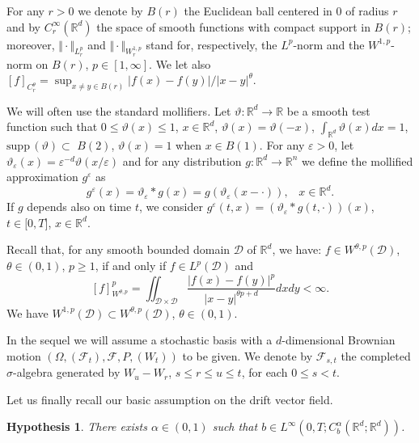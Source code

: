 \documentclass{article}
\newtheorem{hypothesis}{Hypothesis}
\begin{document}
For any $r>0$ we denote by $B(r)$ the Euclidean ball centered in 0 of radius
$r$ and by $C_{r}^{\infty}(\mathbb{R}^{d})$ the space of smooth functions with
compact support in $B(r)$; moreover, $\Vert\cdot\Vert_{L_{r}^{p}}$ and
$\Vert\cdot\Vert_{W_{r}^{1,p}}$ stand for, respectively, the $L^{p}$-norm and
the $W^{1,p}$-norm on $B\left(  r\right)  $, $p\in\left[  1,\infty\right]  $.
We let also $[f]_{C^{\theta}_{r}}=\sup_{x\neq y \in B(r)}%
|f(x)-f(y)|/|x-y|^{\theta}$.

We will often use the standard mollifiers\textit{.} Let $\vartheta
:{\mathbb{R}}^{d}\rightarrow{\mathbb{R}}$ be a smooth test function such that
$0\leq\vartheta(x)\leq1$, $x\in{\mathbb{R}}^{d}$, $\vartheta(x)=\vartheta
(-x)$, $\int_{{\mathbb{R}}^{d}}\vartheta(x)dx=1$, $\mathrm{supp}%
\,(\vartheta)\subset$ $B(2)$, $\vartheta(x)=1$ when $x\in B(1)$. For any
${\varepsilon}>0$, let $\vartheta_{{\varepsilon}}(x)={\varepsilon}%
^{-d}\vartheta(x/{\varepsilon})$ and for any distribution $g:{\mathbb{R}}%
^{d}\rightarrow{\mathbb{R}}^{n}$ we define the mollified approximation
$g^{\varepsilon}$ as
\begin{equation}
g^{\varepsilon}(x)=\vartheta_{{\varepsilon}}\ast g(x)=g(\vartheta
_{{\varepsilon}}(x-\cdot)),\;\;\;x\in{\mathbb{R}}^{d}.\label{molli}%
\end{equation}
If $g$ depends also on time $t$, we consider $g^{\varepsilon}(t,x)=(\vartheta
_{{\varepsilon}}\ast g(t,\cdot))(x)$, $t\in\lbrack0,T]$, $x\in\mathbb{R}^{d}$.

\medskip Recall that, for any smooth bounded domain $\mathcal{D}$ of
$\mathbb{R}^{d}$, we have: $f \in W^{\theta, p} (\mathcal{D})$, $\theta
\in(0,1)$, $p \ge1$, if and only if $f \in L^{p} (\mathcal{D})$ and
\[
[f]_{W^{\theta, p} }^{p} =\iint_{\mathcal{D }\times\mathcal{D}} \frac{|f(x) -
f(y)|^{p}}{|x-y|^{\theta p + d}} dx dy < \infty.
\]
We have $W^{1, p} (\mathcal{D}) \subset W^{\theta, p} (\mathcal{D})$,
$\theta\in(0,1)$.


\bigskip In the sequel we will assume a stochastic basis with a
$d$-dimensional Brownian motion $\left(  \Omega,\left(  \mathcal{F}{}%
_{t}\right)  ,{}\mathcal{F},P,\left(  W_{t}\right)  \right)  $ to be given. We
denote by $\mathcal{F}_{s,t}$ the completed $\sigma$-algebra generated by
$W_{u}-W_{r}$, $s\leq r\leq u\leq t$, for each $0\le s<t$.

\smallskip

Let us finally recall our basic assumption on the drift vector
field.
\begin{hypothesis}
\label{hy1} There exists ${\alpha}\in(0,1)$ such that $b\in
L^{\infty}\left(
0,T;C_{b}^{\alpha}({\mathbb{R}}^{d};{\mathbb{R}}^{d})\right)  $.
\end{hypothesis}
\end{document}
